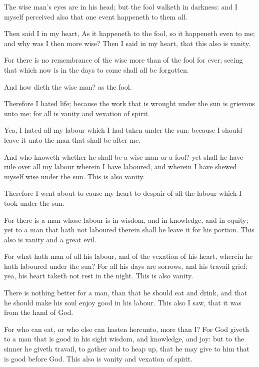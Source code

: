\verse The wise man's eyes are in his head; but the fool walketh in darkness: and I myself perceived also that one event happeneth to them all.

\verse Then said I in my heart, As it happeneth to the fool, so it happeneth even to me; and why was I then more wise? Then I said in my heart, that this also is vanity.

\verse For there is no remembrance of the wise more than of the fool for ever; seeing that which now is in the days to come shall all be forgotten.

And how dieth the wise man? as the fool.

\verse Therefore I hated life; because the work that is wrought under the sun is grievous unto me: for all is vanity and vexation of spirit.

\verse Yea, I hated all my labour which I had taken under the sun: because I should leave it unto the man that shall be after me.

\verse And who knoweth whether he shall be a wise man or a fool? yet shall he have rule over all my labour wherein I have laboured, and wherein I have shewed myself wise under the sun. This is also vanity.

\verse Therefore I went about to cause my heart to despair of all the labour which I took under the sun.

\verse For there is a man whose labour is in wisdom, and in knowledge, and in equity; yet to a man that hath not laboured therein shall he leave it for his portion. This also is vanity and a great evil.

\verse For what hath man of all his labour, and of the vexation of his heart, wherein he hath laboured under the sun?  \verse For all his days are sorrows, and his travail grief; yea, his heart taketh not rest in the night. This is also vanity.

\verse There is nothing better for a man, than that he should eat and drink, and that he should make his soul enjoy good in his labour. This also I saw, that it was from the hand of God.

\verse For who can eat, or who else can hasten hereunto, more than I?  \verse For God giveth to a man that is good in his sight wisdom, and knowledge, and joy: but to the sinner he giveth travail, to gather and to heap up, that he may give to him that is good before God. This also is vanity and vexation of spirit.



